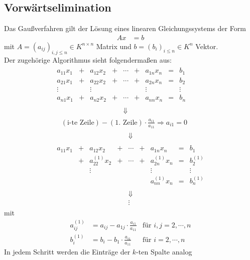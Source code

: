 \documentclass[ngerman,fontsize=11pt, paper=a4, parskip=half, titlepage=true, toc=bib]{scrbook}
\theoremstyle{definition}
\theoremstyle{plain}
\newcommand{\subsectione}[1]{\addtocounter{Def}{1}\subsection{#1}}
\begin{document}
\subsectione{Vorwärtselimination} \label{2.1.1}
Das Gaußverfahren gilt der Lösung eines linearen Gleichungssystems der Form
\begin{align*}
  Ax &= b
\end{align*}
mit $A=(a_{ij})_{i,j \leq n} \in K^{n\times n}$ Matrix und $b=(b_i)_{i\leq n} \in K^n$ Vektor.\\
Der zugehörige Algorithmus sieht folgendermaßen aus:
\begin{gather*}
  \begin{array}{ccccccccc}
    a_{11}x_1 &+& a_{12}x_2 &+& \cdots &+& a_{1n}x_n & = & b_1 ~~\\
    a_{21}x_1 &+& a_{22}x_2 &+& \cdots &+& a_{2n}x_n & = & b_2 \\
    \vdots         &&        \vdots     &&              &&   \vdots       &    & \vdots \\
    a_{n1}x_1 &+& a_{n2}x_2 &+& \cdots &+& a_{nn}x_n & = & b_n \\\\
              &&&& \Downarrow &&&& 
  \end{array} \\
  \quad	(\text{i-te Zeile}) - (\text{1. Zeile})\cdot \frac{a_{i1}}{a_{11}} \Rightarrow a_{i1}=0\\
  \begin{array}{ccccccccc}
    &&&& \Downarrow &&&&  \\\\
    a_{11}x_1 &+& a_{12}x_2 &+& \cdots &+& a_{1n}x_n & = & b_1 \\
    &+& a_{22}^{(1)}x_2 &+& \cdots &+& a_{2n}^{(1)}x_n & = & b_2^{(1)} \\
    &&        \vdots     &&              &&   \vdots       &    & \vdots \\
    && && && a_{nn}^{(1)}x_n & = & b_n^{(1)} \\\\
    &&&& \Downarrow &&&&\\
    &&&& \vdots &&&&
  \end{array} 
\end{gather*}
mit
\begin{align*}
  a_{ij}^{(1)} &= a_{ij}-a_{1j}\cdot \frac{a_{i1}}{a_{11}}
  & \text{für }i,j = 2, \cdots, n \\
  b_i^{(1)}      &= b_i- b_1\cdot \frac{a_{i1}}{a_{11}}
  & \text{für }i = 2, \cdots, n 
\end{align*}
In jedem Schritt werden die Einträge der $k$-ten Spalte analog 
\end{document}
